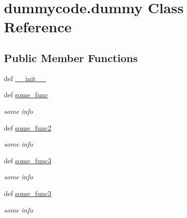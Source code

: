 \section{dummycode.\-dummy Class Reference}
\label{classdummycode_1_1dummy}
\subsection*{Public Member Functions}
\begin{DoxyCompactItemize}
\item 
def \hyperlink{classdummycode_1_1dummy_a674a0e2c1a4f640d13fb13be91869cec}{\-\_\-\-\_\-init\-\_\-\-\_\-}
\item 
def \hyperlink{classdummycode_1_1dummy_a7646a5afb54e46a4ea577bafcb73a4e7}{some\-\_\-func}
\begin{DoxyCompactList}\small\item\em some info \end{DoxyCompactList}\item 
def \hyperlink{classdummycode_1_1dummy_aee9cd7f746f99e79544f048233cf2a1e}{some\-\_\-func2}
\begin{DoxyCompactList}\small\item\em some info \end{DoxyCompactList}\item 
def \hyperlink{classdummycode_1_1dummy_a0ba4f337dcebcb471c9e7947aace7e4e}{some\-\_\-func3}
\begin{DoxyCompactList}\small\item\em some info \end{DoxyCompactList}\item 
def \hyperlink{classdummycode_1_1dummy_a0ba4f337dcebcb471c9e7947aace7e4e}{some\-\_\-func3}
\begin{DoxyCompactList}\small\item\em some info \end{DoxyCompactList}\end{DoxyCompactItemize}
